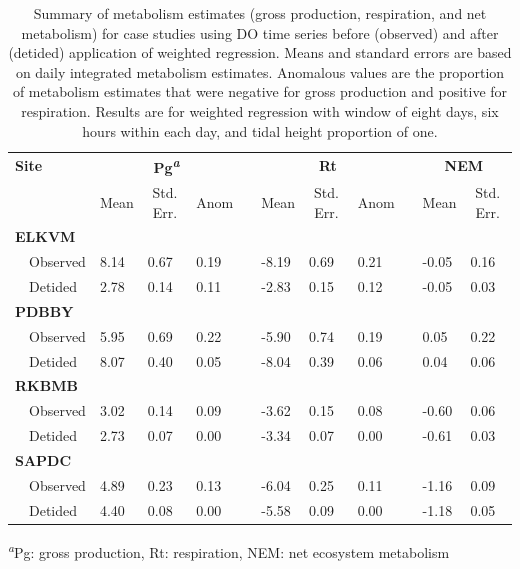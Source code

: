 \documentclass[letterpaper,12pt,oneside]{article}\usepackage[]{graphicx}\usepackage[]{color}
\begin{document}
%
\begin{table}[!tbp]
\caption{Summary of metabolism estimates (gross production, respiration, and net metabolism) for case studies using \ac{DO} time series before (observed) and after (detided) application of weighted regression.  Means and standard errors are based on daily integrated metabolism estimates.  Anomalous values are the proportion of metabolism estimates that were negative for gross production and positive for respiration.  Results are for weighted regression with window of eight days, six hours within each day, and tidal height proportion of one.\label{tab:case_res}} 
\begin{center}
\begin{tabular}{llllclllcll}
\hline\hline
\multicolumn{1}{l}{\bfseries Site}&\multicolumn{3}{c}{\bfseries Pg\textsuperscript{\textit{a}}}&\multicolumn{1}{c}{\bfseries }&\multicolumn{3}{c}{\bfseries Rt}&\multicolumn{1}{c}{\bfseries }&\multicolumn{2}{c}{\bfseries NEM}\tabularnewline
\cline{2-4} \cline{6-8} \cline{10-11}
\multicolumn{1}{l}{}&\multicolumn{1}{c}{Mean}&\multicolumn{1}{c}{Std. Err.}&\multicolumn{1}{c}{Anom}&\multicolumn{1}{c}{}&\multicolumn{1}{c}{Mean}&\multicolumn{1}{c}{Std. Err.}&\multicolumn{1}{c}{Anom}&\multicolumn{1}{c}{}&\multicolumn{1}{c}{Mean}&\multicolumn{1}{c}{Std. Err.}\tabularnewline
\hline
{\bfseries ELKVM}&&&&&&&&&&\tabularnewline
~~Observed&8.14&0.67&0.19&&-8.19&0.69&0.21&&-0.05&0.16\tabularnewline
~~Detided&2.78&0.14&0.11&&-2.83&0.15&0.12&&-0.05&0.03\tabularnewline
\hline
{\bfseries PDBBY}&&&&&&&&&&\tabularnewline
~~Observed&5.95&0.69&0.22&&-5.90&0.74&0.19&& 0.05&0.22\tabularnewline
~~Detided&8.07&0.40&0.05&&-8.04&0.39&0.06&& 0.04&0.06\tabularnewline
\hline
{\bfseries RKBMB}&&&&&&&&&&\tabularnewline
~~Observed&3.02&0.14&0.09&&-3.62&0.15&0.08&&-0.60&0.06\tabularnewline
~~Detided&2.73&0.07&0.00&&-3.34&0.07&0.00&&-0.61&0.03\tabularnewline
\hline
{\bfseries SAPDC}&&&&&&&&&&\tabularnewline
~~Observed&4.89&0.23&0.13&&-6.04&0.25&0.11&&-1.16&0.09\tabularnewline
~~Detided&4.40&0.08&0.00&&-5.58&0.09&0.00&&-1.18&0.05\tabularnewline
\hline
\end{tabular}
\end{center}
\textsuperscript{\textit{a}}Pg: gross production, Rt: respiration, NEM: net ecosystem metabolism\end{table}
\end{document}
